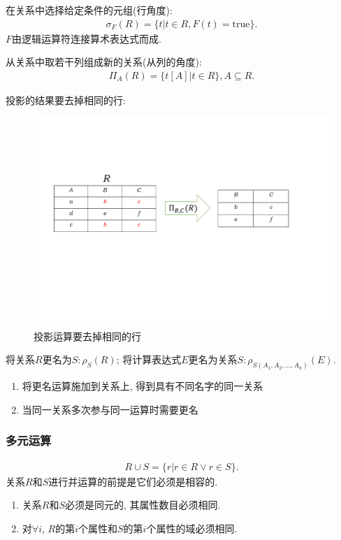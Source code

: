 \begin{definition}[选择运算]
在关系中选择给定条件的元组(行角度):
\begin{align*}
    \sigma_F(R)=\{t|t\in R,F(t)=\text{true}\}.
\end{align*}
$F$由逻辑运算符连接算术表达式而成.
\end{definition}

\begin{definition}[投影运算]
从关系中取若干列组成新的关系(从列的角度):
\begin{align*}
    \Pi_A(R) = \{t[A]|t\in R\}, A \subseteq R.
\end{align*}
\end{definition}

投影的结果要去掉相同的行:
\begin{figure}[H]
    \centering
    \includegraphics[width=.7\textwidth]{./figure/投影.pdf}
    \caption{投影运算要去掉相同的行}
\end{figure}

\begin{definition}[更名运算]
将关系$R$更名为$S: \rho_S(R)$; 将计算表达式$E$更名为关系$S: \rho_{S(A_1,A_2,...,A_n)}(E)$.
\begin{enumerate}
    \item 将更名运算施加到关系上, 得到具有不同名字的同一关系
    \item 当同一关系多次参与同一运算时需要更名
\end{enumerate}
\end{definition}

\subsubsection{多元运算}

\begin{definition}[并运算]
\begin{align*}
    R\cup S =\{r|r\in R\lor r \in S\}.
\end{align*}
关系$R$和$S$进行并运算的前提是它们必须是相容的.
\begin{enumerate}
    \item 关系$R$和$S$必须是同元的, 其属性数目必须相同.
    \item 对$\forall i$, $R$的第$i$个属性和$S$的第$i$个属性的域必须相同.
\end{enumerate}
\end{definition}

